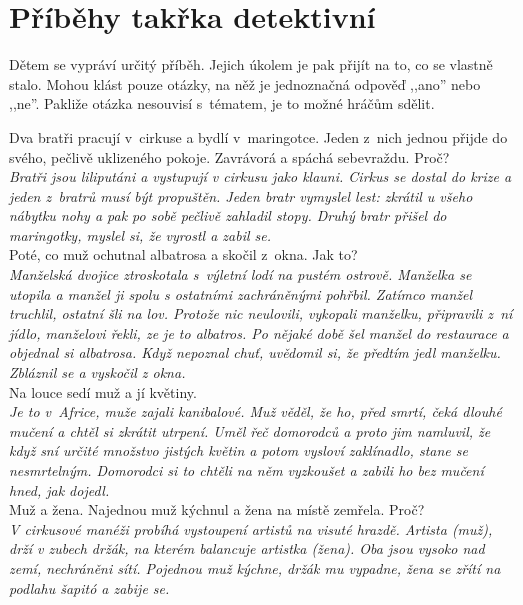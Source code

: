 
\section{Příběhy takřka detektivní}

Dětem se vypráví určitý příběh. Jejich úkolem je pak přijít 
na to, co se vlastně stalo. Mohou klást pouze otázky, na něž 
je jednoznačná odpověď ,,ano'' nebo ,,ne''. Pakliže otázka nesouvisí 
s~tématem, je to možné hráčům sdělit.

\begin{multicols}{2}

\noindent
Dva bratři pracují v~cirkuse a bydlí v~maringotce. 
Jeden z~nich jednou přijde do svého, pečlivě uklizeného 
pokoje. Zavrávorá a spáchá sebevraždu. Proč?\\[1 mm]
{\sl Bratři jsou liliputáni a vystupují v cirkusu jako klauni. 
Cirkus se dostal do krize a jeden z~bratrů musí být propuštěn. 
Jeden bratr vymyslel lest: zkrátil u všeho nábytku nohy a pak 
po sobě pečlivě zahladil stopy. Druhý bratr přišel do maringotky, 
myslel si, že vyrostl a zabil se.}\\

\noindent
Poté, co muž ochutnal albatrosa a skočil z~okna. Jak to?\\[1 mm]
{\sl Manželská dvojice ztroskotala s~výletní lodí na pustém 
ostrově. Manželka se utopila a manžel ji spolu s ostatními zachráněnými 
pohřbil. Zatímco manžel truchlil, ostatní šli na lov. Protože 
nic neulovili, vykopali manželku, připravili z~ní jídlo, 
manželovi řekli, ze je to albatros. Po nějaké době šel manžel 
do restaurace a objednal si albatrosa. Když nepoznal chuť, uvědomil 
si, že předtím jedl manželku. Zbláznil se a vyskočil z okna.}\\

\noindent
Na louce sedí muž a jí květiny.\\[1 mm]
{\sl Je to v~Africe, muže zajali kanibalové. Muž věděl, 
že ho, před smrtí, čeká dlouhé mučení a chtěl si zkrátit utrpení. 
Uměl řeč domorodců a proto jim namluvil, že když sní určité množstvo 
jistých květin a potom vysloví zaklínadlo, stane se nesmrtelným. 
Domorodci si to chtěli na něm vyzkoušet a zabili ho bez mučení 
hned, jak dojedl.}\\

\noindent
Muž a žena. Najednou muž kýchnul a žena na místě zemřela.
Proč?\\[1 mm]
{\sl V cirkusové manéži probíhá vystoupení artistů na visuté hrazdě. 
Artista (muž), drží v zubech držák, na kterém balancuje artistka 
(žena). Oba jsou vysoko nad zemí, nechráněni sítí. Pojednou muž 
kýchne, držák mu vypadne, žena se zřítí na podlahu šapitó a zabije 
se.}\\


\end{multicols}
